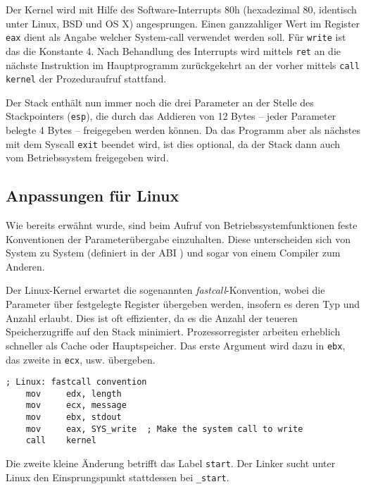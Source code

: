 Der Kernel wird mit Hilfe des Software-Interrupts 80h (hexadezimal 80, identisch unter Linux, BSD und OS X) angesprungen. Einen ganzzahliger Wert im Register \texttt{eax} dient als Angabe welcher System-call verwendet werden soll. Für {\tt write} ist das die Konstante 4. Nach Behandlung des Interrupts wird mittels \texttt{ret} an die nächste Instruktion im Hauptprogramm zurückgekehrt an der vorher mittels \texttt{call kernel} der Prozeduraufruf stattfand.

Der Stack enthält nun immer noch die drei Parameter an der Stelle des Stackpointers ({\tt esp}), die durch das Addieren von 12 Bytes -- jeder Parameter belegte 4 Bytes -- freigegeben werden können. Da das Programm aber als nächstes mit dem Syscall \texttt{exit} beendet wird, ist dies optional, da der Stack dann auch vom Betriebssystem freigegeben wird.


\subsection{Anpassungen für Linux}

Wie bereits erwähnt wurde, sind beim Aufruf von Betriebssystemfunktionen feste Konventionen \cite{wp:callconv} der Parameterübergabe einzuhalten. Diese unterscheiden sich von System zu System (definiert in der ABI \cite{wp:abi}) und sogar von einem Compiler zum Anderen.

Der Linux-Kernel erwartet die sogenannten \emph{fastcall}-Konvention, wobei die Parameter über festgelegte Register übergeben werden, insofern es deren Typ und Anzahl erlaubt. Dies ist oft effizienter, da es die Anzahl der teueren Speicherzugriffe auf den Stack minimiert. Prozessorregister arbeiten erheblich schneller als Cache oder Hauptspeicher. Das erste Argument wird dazu in {\tt ebx}, das zweite in {\tt ecx}, usw. übergeben.

\begin{lstlisting}[caption=Linux-Kernel Aufrufkonvention]
    ; Linux: fastcall convention
    mov     edx, length
    mov     ecx, message
    mov     ebx, stdout
    mov     eax, SYS_write  ; Make the system call to write
    call    kernel
\end{lstlisting}

Die zweite kleine Änderung betrifft das Label {\tt start}. Der Linker sucht unter Linux den Einsprungspunkt stattdessen bei {\tt \_start}.
